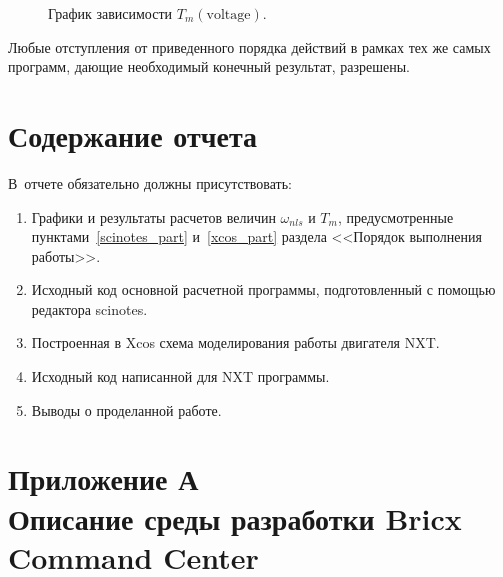 \documentclass[12pt,a4paper,openany]{extarticle}
\begin{document}
\begin{enumerate}
\begin{figure}[h!]
	\label{omega_nls_power}
\end{figure}
\begin{figure}[h!]
	\noindent{}
	\caption{График зависимости $T_m(\mathrm{voltage})$.}
	\label{Tm_power}
\end{figure}
\end{enumerate}

Любые отступления от приведенного порядка действий в рамках тех же самых программ, дающие необходимый конечный результат, разрешены.
 
\newpage 
\section{Содержание отчета}
\hspace*{\parindent}В~отчете обязательно должны присутствовать:
\begin{enumerate}
\item Графики и результаты расчетов величин $\omega_{nls}$ и $T_m$, предусмотренные пунктами~\ref{scinotes_part} и~\ref{xcos_part} раздела <<Порядок выполнения работы>>.
\item Исходный код основной расчетной программы, подготовленный с помощью редактора scinotes.
\item Построенная в Xcos схема моделирования работы двигателя NXT.
\item Исходный код написанной для NXT программы.
\item Выводы о проделанной работе.
\end{enumerate} \newpage
\section{Приложение А\\Описание среды разработки Bricx Command Center}
\end{document}
